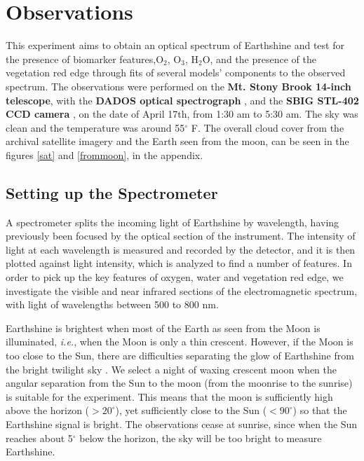 \section{Observations}

This experiment aims to obtain an optical spectrum of Earthshine and test for
the presence of biomarker features,\eg O$_2$, O$_3$, H$_2$O, and the presence of
the vegetation red edge through fits of several models' components to the
observed spectrum. The observations were performed on the {\bf Mt. Stony Brook
14-inch telescope}, with the {\bf DADOS optical spectrograph} \cite{dados}, and
the {\bf SBIG STL-402 CCD camera} \cite{CCD}, on the date of April 17th, from
1:30 am to 5:30 am. The sky was clean and the temperature was around
55$^{\circ}$ F. The overall cloud cover from the archival satellite imagery and
the Earth seen from the moon, can be seen in the figures \ref{sat} and
\ref{frommoon},  in the appendix.




\subsection{Setting up the Spectrometer}
A spectrometer  splits the incoming light
of Earthshine by wavelength, having previously been focused by the optical
section of the instrument. The intensity of light at each wavelength is
measured and recorded by the detector, and it is then  plotted  against light
intensity, which is analyzed to find a number of
features. In order to pick up the key features of oxygen, water and vegetation
red edge, we investigate the visible and near infrared sections of
the electromagnetic spectrum, with light of wavelengths between  500 to
800 nm.






Earthshine is brightest when most of the Earth as seen from the Moon is
illuminated, {\it i.e.}, when the Moon is only a thin crescent. However, if the
Moon is too close to the Sun, there are  difficulties  separating
the glow of Earthshine from the bright twilight sky \cite{woolf_etal02}.
We select  a  night of waxing crescent moon when  the angular separation from
the Sun to the moon (from the moonrise to the sunrise) is suitable for the
experiment. This means that   the moon is sufficiently high above the
horizon ($>20^{\circ}$), yet sufficiently close to the Sun
($<90^{\circ}$) so that the Earthshine signal is bright.  The observations
cease at sunrise, since when the Sun reaches about 5$^{\circ}$ below the
horizon, the sky will  be too bright  to measure Earthshine. 



